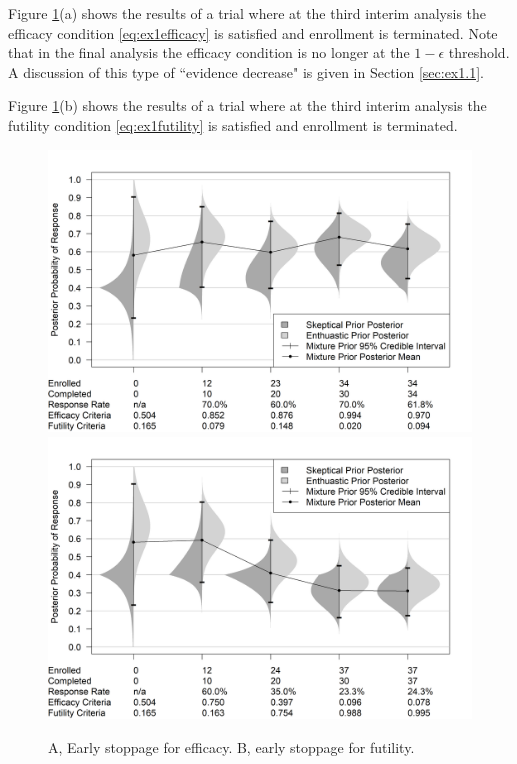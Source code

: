 \documentclass[12pt]{article}
\begin{document}
Figure \ref{fig:figure2}(a) shows the results of a trial where at the third interim analysis the efficacy condition \eqref{eq:ex1efficacy} is satisfied and enrollment is terminated. Note that in the final analysis the efficacy condition is no longer at the $1-\epsilon$ threshold. A discussion of this type of ``evidence decrease" is given in Section \ref{sec:ex1.1}.

Figure \ref{fig:figure2}(b) shows the results of a trial where at the third interim analysis the futility condition \eqref{eq:ex1futility} is satisfied and enrollment is terminated. 

\begin{figure}\begin{center}
    \includegraphics[width=7in]{./FIGURES/figure2a.png}
    \includegraphics[width=7in]{./FIGURES/figure2b.png}
    \caption{A, Early stoppage for efficacy. B, early stoppage for futility.}
	\label{fig:figure2}

 
\end{center}\end{figure}
\end{document}
